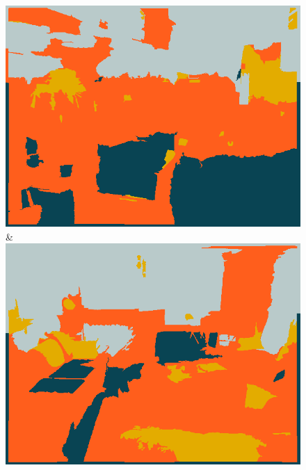 \documentclass[a4paper, 10pt, conference]{ieeeconf}      %
\begin{document}
\begin{figure}
\begin{tabu}
    \includegraphics[width=\linewidth]{images/00118_ssvm.png}&%
    \includegraphics[width=\linewidth]{images/01203_ssvm.png}\\
    \\


\end{tabu}
\end{figure}
\end{document}
